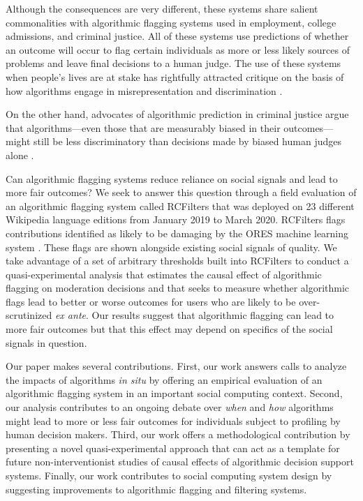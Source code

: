 \documentclass[format=acmsmall, natbib=true,  screen=true]{acmart}
\begin{document}
Although the consequences are very different, these systems share salient commonalities with algorithmic flagging systems used in employment, college admissions, and criminal justice. All of these systems use predictions of whether an outcome will occur to flag certain individuals as more or less likely sources of problems and leave final decisions to a human judge.
The use of these systems when people's lives are at stake has rightfully attracted critique on the basis of how algorithms engage in misrepresentation and discrimination \cite{campolo_ai_2017, oneil_weapons_2018,barocas_fairness_2019}. 

On the other hand, advocates of algorithmic prediction in criminal justice argue that algorithms---even those that are measurably biased in their outcomes---might still be less discriminatory than decisions made by biased human judges alone \cite{kleinberg_human_2018, stevenson_assessing_2017}. 

Can algorithmic flagging systems reduce reliance on social signals and lead to more fair outcomes? We seek to answer this question through a field evaluation of an algorithmic flagging system called RCFilters that was deployed on 23 different Wikipedia language editions from January 2019 to March 2020.  RCFilters flags contributions identified as likely to be damaging by the ORES machine learning system \citep{halfaker_ores:_2019}. These flags are shown alongside existing social signals of quality. We take advantage of a set of arbitrary thresholds built into RCFilters to conduct a quasi-experimental analysis that estimates the causal effect of algorithmic flagging on moderation decisions and that seeks to measure whether algorithmic flags lead to better or worse outcomes for users who are likely to be over-scrutinized \textit{ex ante}.
Our results suggest that algorithmic flagging can lead to more fair outcomes but that this effect may depend on specifics of the social signals in question.

Our paper makes several contributions.
First, our work answers calls to analyze the impacts of algorithms \textit{in situ} \cite{selbst_fairness_2019, stevenson_assessing_2017, zhu_value-sensitive_2018} by offering an empirical evaluation of an algorithmic flagging system in an important social computing context. 
Second, our analysis contributes to an ongoing debate over \emph{when} and \emph{how} algorithms might lead to more or less fair outcomes for individuals subject to profiling by human decision makers.
Third, our work offers a methodological contribution by presenting a novel quasi-experimental approach that can act as a template for future non-interventionist studies of causal effects of algorithmic decision support systems. 
Finally, our work contributes to social computing system design by suggesting improvements to algorithmic flagging and filtering systems. 
\end{document}
